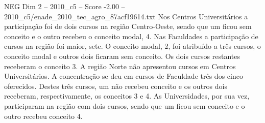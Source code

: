 \begin{textsample}{NEG Dim 2 – 2010\_c5 – Score -2.00 – 2010\_c5/enade\_2010\_tec\_agro\_87acf19614.txt}
Nos Centros Universitários a participação foi de dois cursos na região Centro-Oeste, sendo que um ficou sem conceito e o outro recebeu o conceito modal, 4.
Nas Faculdades a participação de cursos na região foi maior, sete.
O conceito modal, 2, foi atribuído a três cursos, o conceito modal e outros dois ficaram sem conceito.
Os dois cursos restantes receberam o conceito 3.
A região Norte não apresentou cursos em Centros Universitários.
A concentração se deu em cursos de Faculdade três dos cinco oferecidos.
Destes três cursos, um não recebeu conceito e os outros dois receberam, respectivamente, os conceitos 3 e 4.
As Universidades, por sua vez, participaram na região com dois cursos, sendo que um ficou sem conceito e o outro recebeu conceito 4.

\end{textsample}
